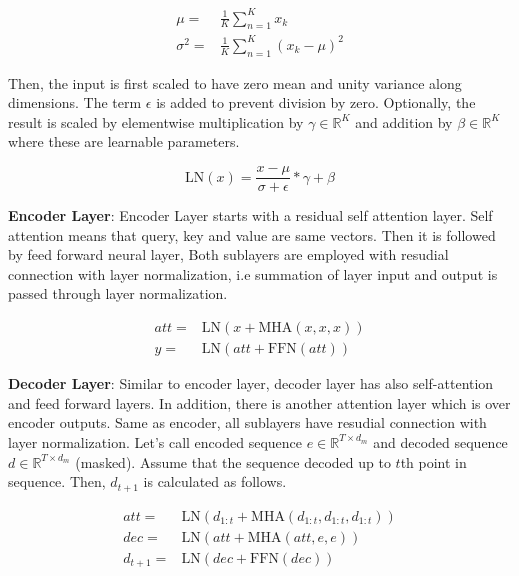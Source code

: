 \begin{equation}
\label{eq:layernorm_statistics}
\begin{split}
\mu = & \frac{1}{K} \sum_{n=1}^{K} x_k \\
\sigma^2 = & \frac{1}{K} \sum_{n=1}^{K} (x_k-\mu)^2
\end{split}
\end{equation} 

Then, the input is first scaled to have zero mean and unity variance along dimensions. The term $\epsilon$ is added to prevent division by zero. Optionally, the result is scaled by elementwise multiplication by $\gamma \in \mathbb{R}^K$ and addition by $\beta \in \mathbb{R}^K$ where these are learnable parameters. 

\begin{equation}
\label{eqn:layernorm}
\mathrm{LN}(x) = \frac{x-\mu}{\sigma+\epsilon} * \gamma + \beta
\end{equation}

\textbf{Encoder Layer}: Encoder Layer starts with a residual self attention layer. Self attention means that query, key and value are same vectors. Then it is followed by feed forward neural layer, Both sublayers are employed with resudial connection with layer normalization, i.e summation of layer input and output is passed through layer normalization.

\begin{equation}
\begin{split}
att = & \mathrm{LN}(x+ \mathrm{MHA}(x,x,x)) \\
y = & \mathrm{LN}(att+ \mathrm{FFN}(att))
\end{split}
\end{equation}

\textbf{Decoder Layer}: Similar to encoder layer, decoder layer has also self-attention and feed forward layers. In addition, there is another attention layer which is over encoder outputs. Same as encoder, all sublayers have resudial connection with layer normalization. Let's call encoded sequence $e \in \mathbb{R}^{T \times d_m}$ and decoded sequence $d \in \mathbb{R}^{T \times d_m}$ (masked). Assume that the sequence decoded up to $t$th point in sequence. Then, $d_{t+1}$ is calculated as follows.

\begin{equation}
\begin{split}
att = & \mathrm{LN}(d_{1:t}+\mathrm{MHA}(d_{1:t},d_{1:t},d_{1:t})) \\
dec = & \mathrm{LN}(att+ \mathrm{MHA}(att,e,e)) \\
d_{t+1} = & \mathrm{LN}(dec+ \mathrm{FFN}(dec))
\end{split}
\end{equation}

